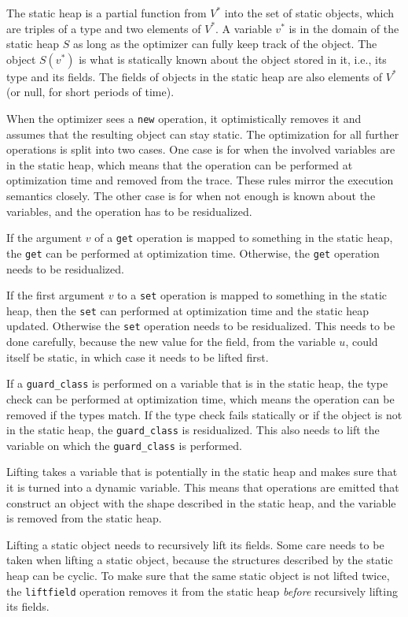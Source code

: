\documentclass[preprint]{sigplanconf}
\newcommand\ie{i.e.,\xspace}
\begin{document}
The static heap is a partial function from $V^*$ into the
set of static objects, which are triples of a type and two elements of $V^*$.
A variable $v^*$ is in the domain of the static heap $S$ as long as the
optimizer can fully keep track of the object. The object $S(v^*)$ is what is
statically known about the object stored in it, \ie its type and its fields. The
fields of objects in the static heap are also elements of $V^*$ (or null, for
short periods of time).

When the optimizer sees a \lstinline{new} operation, it optimistically removes it and
assumes that the resulting object can stay static. The optimization for all
further operations is split into two cases. One case is for when the
involved variables are in the static heap, which means that the operation can be
performed at optimization time and removed from the trace. These rules mirror
the execution semantics closely. The other case is for when not enough is known about
the variables, and the operation has to be residualized.

If the argument $v$ of a \lstinline{get} operation is mapped to something in the static
heap, the \lstinline{get} can be performed at optimization time. Otherwise, the \lstinline{get}
operation needs to be residualized.

If the first argument $v$ to a \lstinline{set} operation is mapped to something in the
static heap, then the \lstinline{set} can performed at optimization time and the static heap
updated. Otherwise the \lstinline{set} operation needs to be residualized. This needs to be
done carefully, because the new value for the field, from the variable $u$,
could itself be static, in which case it needs to be lifted first.

If a \lstinline{guard_class} is performed on a variable that is in the static heap, the type check
can be performed at optimization time, which means the operation can be removed
if the types match. If the type check fails statically or if the object is not
in the static heap, the \lstinline{guard_class} is residualized. This also needs to
lift the variable on which the \lstinline{guard_class} is performed.

Lifting takes a variable that is potentially in the static heap and makes sure
that it is turned into a dynamic variable. This means that operations are
emitted that construct an object with the shape described in the
static heap, and the variable is removed from the static heap.

Lifting a static object needs to recursively lift its fields. Some care needs to
be taken when lifting a static object, because the structures described by the
static heap can be cyclic. To make sure that the same static object is not lifted
twice, the \lstinline{liftfield} operation removes it from the static heap \emph{before}
recursively lifting its fields.
\end{document}
